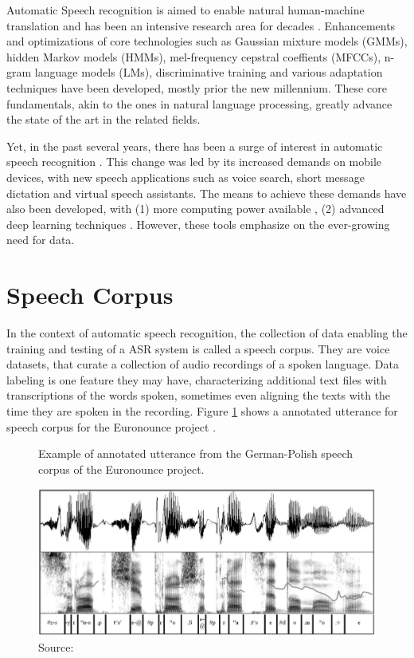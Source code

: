 Automatic Speech recognition is aimed to enable natural human-machine translation and has been an intensive research area for decades \cite{yu2016automatic}. Enhancements and optimizations of core technologies such as Gaussian mixture models (GMMs), hidden Markov models (HMMs), mel-frequency cepstral coeffients (MFCCs), n-gram language models (LMs), discriminative training and various adaptation techniques have been developed, mostly prior the new millennium. These core fundamentals, akin to the ones in natural language processing, greatly advance the state of the art in the related fields.

Yet, in the past several years, there has been a surge of interest in automatic speech recognition \cite{jurafsky2016speech}. This change was led by its increased demands on mobile devices, with new speech applications such as voice search, short message dictation and virtual speech assistants. The means to achieve these demands have also been developed, with (1) more computing power available \cite{ECONOMOU2004279}, (2) advanced deep learning techniques \cite{graves2013speech}. However, these tools emphasize on the ever-growing need for data.

\section{Speech Corpus}

In the context of automatic speech recognition, the collection of data enabling the training and testing of a ASR system is called a speech corpus. They are voice datasets, that curate a collection of audio recordings of a spoken language. Data labeling is one feature they may have, characterizing additional text files with transcriptions of the words spoken, sometimes even aligning the texts with the time they are spoken in the recording. Figure \ref{fig:annotated-speech-corpus} shows a annotated utterance for speech corpus for the Euronounce project \cite{demenko2009applying}.

\begin{figure}[h]
    \centering
    \caption{Example of annotated utterance from the German-Polish speech corpus of the Euronounce project.}
    \includegraphics[width=0.8\linewidth]{images/background/annotated-speech-corpus.png}
    \caption*{Source: \cite{demenko2009applying}}
    \label{fig:annotated-speech-corpus}
\end{figure}

